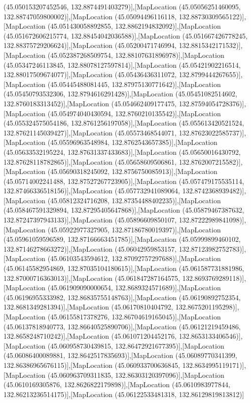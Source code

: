 (45.050153207452546, 132.8874491403279)],[MapLocation (45.05056251460095, 132.88747059800002)],[MapLocation (45.05094496116118, 132.88730309565122)],[MapLocation (45.051430058892855, 132.8862194832092)],[MapLocation (45.051672606215774, 132.88454042036588)],[MapLocation (45.051667426778245, 132.88375729206624)],[MapLocation (45.05200471746994, 132.8815342171532)],[MapLocation (45.052387268509754, 132.88107631896978)],[MapLocation (45.05347246113845, 132.88078127597814)],[MapLocation (45.05421902216514, 132.88017509674077)],[MapLocation (45.05436436311072, 132.8799444267655)],[MapLocation (45.05445488081445, 132.87975130771642)],[MapLocation (45.05450793532306, 132.8794616291428)],[MapLocation (45.05451082514602, 132.8760183313452)],[MapLocation (45.054662409177475, 132.87594054728376)],[MapLocation (45.054974040430594, 132.8760210135542)],[MapLocation (45.055324575054186, 132.8761256197058)],[MapLocation (45.055613420521524, 132.87621145039427)],[MapLocation (45.05573468544071, 132.87623022585737)],[MapLocation (45.05596963548984, 132.8762543657385)],[MapLocation (45.05633532195224, 132.87631337433683)],[MapLocation (45.05650016430792, 132.87628118782865)],[MapLocation (45.05658609506861, 132.8762007215582)],[MapLocation (45.05690318245092, 132.8756750085913)],[MapLocation (45.05714002241488, 132.87527267723905)],[MapLocation (45.057479175535114, 132.87466336518156)],[MapLocation (45.057732941089064, 132.8742368939482)],[MapLocation (45.05812324716208, 132.87354488402235)],[MapLocation (45.058467591329894, 132.87295405647868)],[MapLocation (45.05879467387632, 132.87247397943133)],[MapLocation (45.05896609850107, 132.87222989841098)],[MapLocation (45.05922977327905, 132.87186780019397)],[MapLocation (45.05961059596589, 132.87166663451785)],[MapLocation (45.05999899460102, 132.87146278663272)],[MapLocation (45.06042959853157, 132.87123982752783)],[MapLocation (45.06103543594612, 132.87092757297688)],[MapLocation (45.06145582954869, 132.87035104180615)],[MapLocation (45.061587731881986, 132.87000716363013)],[MapLocation (45.061847287164575, 132.8693769289118)],[MapLocation (45.061909090000654, 132.8689324571689)],[MapLocation (45.06196955333982, 132.86835755148763)],[MapLocation (45.06190892752354, 132.8681349281394)],[MapLocation (45.06170810404792, 132.8675201195298)],[MapLocation (45.06155817378276, 132.86704619165045)],[MapLocation (45.06137818940773, 132.86640525890706)],[MapLocation (45.06121219459486, 132.8658248710242)],[MapLocation (45.061071204452176, 132.8653133406546)],[MapLocation (45.060958730439815, 132.86472921677395)],[MapLocation (45.06086400089881, 132.8642517835693)],[MapLocation (45.06089770341399, 132.86386965676115)],[MapLocation (45.060933700636845, 132.8634995119171)],[MapLocation (45.060963709311835, 132.86303120397096)],[MapLocation (45.0610169305876, 132.8626822179898)],[MapLocation (45.0610983977844, 132.86213236514175)],[MapLocation (45.06122533481318, 132.86129819813812)]